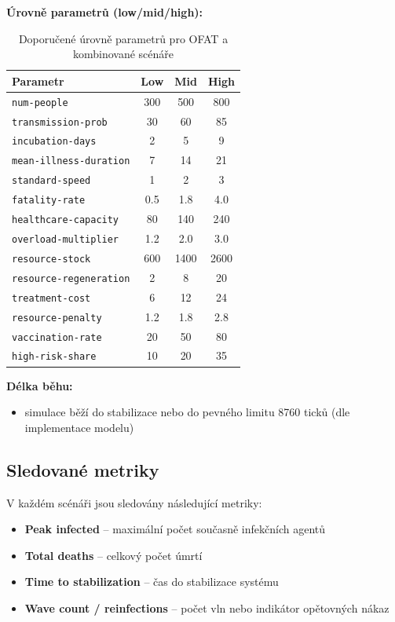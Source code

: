 \textbf{Úrovně parametrů (low/mid/high):}
\begin{table}[h]
\centering
\begin{tabular}{l c c c}
\hline
\textbf{Parametr} & \textbf{Low} & \textbf{Mid} & \textbf{High} \\
\hline
\texttt{num-people} & 300 & 500 & 800 \\
\texttt{transmission-prob} & 30 & 60 & 85 \\
\texttt{incubation-days} & 2 & 5 & 9 \\
\texttt{mean-illness-duration} & 7 & 14 & 21 \\
\texttt{standard-speed} & 1 & 2 & 3 \\
\texttt{fatality-rate} & 0.5 & 1.8 & 4.0 \\
\texttt{healthcare-capacity} & 80 & 140 & 240 \\
\texttt{overload-multiplier} & 1.2 & 2.0 & 3.0 \\
\texttt{resource-stock} & 600 & 1400 & 2600 \\
\texttt{resource-regeneration} & 2 & 8 & 20 \\
\texttt{treatment-cost} & 6 & 12 & 24 \\
\texttt{resource-penalty} & 1.2 & 1.8 & 2.8 \\
\texttt{vaccination-rate} & 20 & 50 & 80 \\
\texttt{high-risk-share} & 10 & 20 & 35 \\
\hline
\end{tabular}
\caption{Doporučené úrovně parametrů pro OFAT a kombinované scénáře}
\label{tab:param_levels}
\end{table}

\textbf{Délka běhu:}
\begin{itemize}
\item simulace běží do stabilizace nebo do pevného limitu 8760 ticků (dle implementace modelu)
\end{itemize}

\subsection{Sledované metriky}

V každém scénáři jsou sledovány následující metriky:
\begin{itemize}
\item \textbf{Peak infected} -- maximální počet současně infekčních agentů
\item \textbf{Total deaths} -- celkový počet úmrtí
\item \textbf{Time to stabilization} -- čas do stabilizace systému
\item \textbf{Wave count / reinfections} -- počet vln nebo indikátor opětovných nákaz
\end{itemize}


